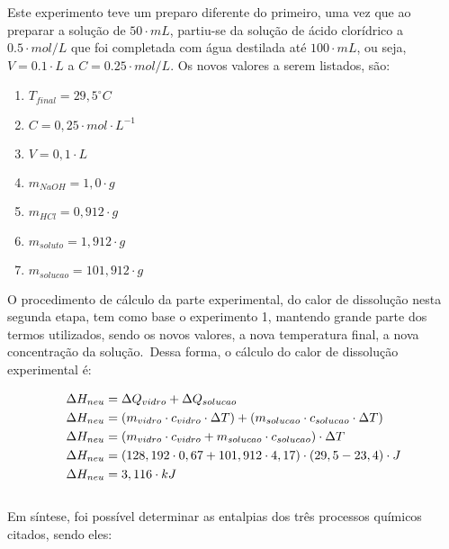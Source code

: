 			\indent Este experimento teve um preparo diferente do primeiro, uma vez que ao preparar a solução de $50\cdot mL$, partiu-se da solução de ácido clorídrico a $0.5\cdot mol / L$ que foi completada com água destilada até $100\cdot mL$, ou seja, $V = 0.1\cdot L$ a $C = 0.25 \cdot mol / L$. Os novos valores a serem listados, são:\
			
            \begin{enumerate}
                \item $T_{final} = 29,5 ^{\circ}C$
            	\item $C = 0,25 \cdot mol \cdot L^{-1}$
                \item $V = 0,1 \cdot L$
                \item $m_{NaOH} = 1,0 \cdot g$
                \item $m_{HCl} = 0,912 \cdot g$
                \item $m_{soluto} = 1,912 \cdot g$
                \item $m_{solucao} = 101,912 \cdot g$
            \end{enumerate}
        
        	\indent O procedimento de cálculo da parte experimental, do calor de dissolução nesta segunda etapa, tem como base o experimento 1, mantendo grande parte dos termos utilizados, sendo os novos valores, a nova temperatura final, a nova concentração da solução.\ Dessa forma, o cálculo do calor de dissolução experimental é:\

            \begin{equation}
            	\begin{split}
            		\notag
            		\Delta{H_{neu}} &= \Delta Q_{vidro} + \Delta Q_{solucao} \\
            		\Delta{H_{neu}} &= (m_{vidro} \cdot c_{vidro} \cdot \Delta T) + (m_{solucao} \cdot c_{solucao} \cdot \Delta T) \\
            		\Delta{H_{neu}} &= (m_{vidro} \cdot c_{vidro} + m_{solucao} \cdot c_{solucao}) \cdot \Delta T \\
            		\Delta{H_{neu}} &= (128,192 \cdot 0,67 + 101,912 \cdot 4,17) \cdot (29,5 - 23,4) \cdot J \\
            		\Delta{H_{neu}} &= 3,116 \cdot kJ
            	\end{split}
            \end{equation}\\
            
        
        \indent Em síntese, foi possível determinar as entalpias dos três processos químicos citados, sendo eles:
        
